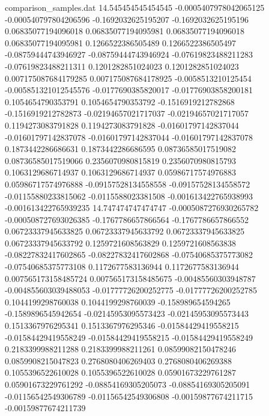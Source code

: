 \begin{filecontents}{comparison_samples.dat}
14.545454545454545  -0.0005407978042065125  -0.000540797804206596   -0.1692032625195207    -0.1692032625195196    0.06835077194096018    0.06835077194095981    0.06835077194096018    0.06835077194095981    0.1266522386505489     0.1266522386505497     -0.08759444743946927    -0.08759444743946924    -0.07619823488211283   -0.07619823488211311   0.1201282851024023      0.1201282851024023      0.007175087684179285    0.007175087684178925    -0.0058513210125454     -0.005851321012545576   -0.0177690385820017     -0.01776903858200181    0.1054654790353791      0.1054654790353792      -0.1516919212782868     -0.1516919212782873     -0.02194657021717037   -0.02194657021717057   0.1194273083791828     0.1194273083791828     -0.01601797142837044    -0.01601797142837078    -0.01601797142837044    -0.01601797142837078    0.1873442286686631     0.1873442286686595     0.08736585017519082     0.08736585017519066     0.2356070980815819     0.2356070980815793     0.1063129686714937      0.1063129686714937      0.05986717574976883     0.05986717574976888     -0.09157528134558558   -0.09157528134558572   -0.01155880233815062   -0.0115588023381508    -0.001613422765938993   -0.001613422765939235 
14.747474747474747  -0.0005087276930265782  -0.000508727693026385   -0.1767786657866564    -0.1767786657866552    0.06723337945633825    0.06723337945633792    0.06723337945633825    0.06723337945633792    0.1259721608563829     0.1259721608563838     -0.08227832417602865    -0.08227832417602868    -0.07540685375773082   -0.07540685375773108   0.1172677583136944      0.1172677583136944      0.007565173158485724    0.007565173158485675    -0.00485560303948787    -0.004855603039488053   -0.01777726200252775    -0.01777726200252785    0.1044199298760038      0.1044199298760039      -0.158989654594265      -0.1589896545942654     -0.02145953095573423   -0.02145953095573443   0.1513367976295341     0.1513367976295346     -0.01584429419558215    -0.01584429419558249    -0.01584429419558215    -0.01584429419558249    0.2183399988211288     0.2183399988211261     0.08599082150478246     0.0859908215047823      0.2768080406269403     0.2768080406269388     0.1055396522610028      0.1055396522610028      0.05901673229761287     0.05901673229761292     -0.08854169305205073   -0.08854169305205091   -0.01156542549306789   -0.01156542549306808   -0.00159877674211715    -0.00159877674211739  

\end{filecontents}
